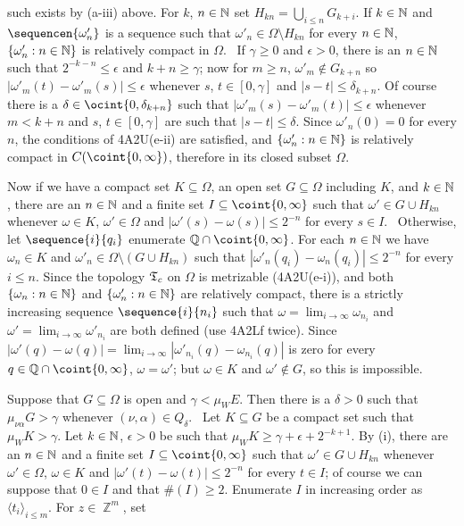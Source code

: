{

\noindent such exists by (a-iii) above.   For $k$, $n\in\Bbb N$ set
$H_{kn}=\bigcup_{i\le n}G_{k+i}$.   If $k\in\Bbb N$ and
$\sequencen{\omega'_n}$ is a sequence such that
$\omega'_n\in\Omega\setminus H_{kn}$ for every $n\in\Bbb N$,
$\{\omega'_n:n\in\Bbb N\}$ is relatively compact in $\Omega$.   \Prf\
If $\gamma\ge 0$ and $\epsilon>0$, there is an $n\in\Bbb N$
such that $2^{-k-n}\le\epsilon$ and $k+n\ge\gamma$;  now for $m\ge n$,
$\omega'_m\notin G_{k+n}$ so
$|\omega'_m(t)-\omega'_m(s)|\le\epsilon$ whenever
$s$, $t\in[0,\gamma]$ and $|s-t|\le\delta_{k+n}$.   Of course there is a
$\delta\in\ocint{0,\delta_{k+n}}$ such that
$|\omega'_m(s)-\omega'_m(t)|\le\epsilon$ whenever $m<k+n$ and $s$,
$t\in[0,\gamma]$ are such that $|s-t|\le\delta$.   Since $\omega'_n(0)=0$
for every $n$, the conditions of
4A2U(e-ii) are satisfied, and $\{\omega'_n:n\in\Bbb N\}$ is relatively
compact in $C(\coint{0,\infty})$, therefore in its closed subset $\Omega$.\
\Qed

Now if we have a compact set
$K\subseteq\Omega$, an open set $G\subseteq\Omega$ including $K$, and
$k\in\Bbb N$, there are an $n\in\Bbb N$ and a finite set
$I\subseteq\coint{0,\infty}$ such that $\omega'\in G\cup H_{kn}$ whenever
$\omega\in K$, $\omega'\in\Omega$ and $|\omega'(s)-\omega(s)|\le 2^{-n}$
for every $s\in I$.   \Prf\Quer\ Otherwise, let $\sequence{i}{q_i}$
enumerate $\Bbb Q\cap\coint{0,\infty}$.   For each $n\in\Bbb N$ we have
$\omega_n\in K$ and $\omega'_n\in\Omega\setminus(G\cup H_{kn})$ such that
$|\omega'_n(q_i)-\omega_n(q_i)|\le 2^{-n}$ for every $i\le n$.
Since the topology $\frak T_c$ on $\Omega$ is metrizable (4A2U(e-i)),
and both
$\{\omega_n:n\in\Bbb N\}$ and $\{\omega'_n:n\in\Bbb N\}$ are relatively
compact, there is a strictly increasing sequence $\sequence{i}{n_i}$ such
that $\omega=\lim_{i\to\infty}\omega_{n_i}$ and
$\omega'=\lim_{i\to\infty}\omega'_{n_i}$ are both defined (use 4A2Lf
twice).   Since $|\omega'(q)-\omega(q)|
=\lim_{i\to\infty}|\omega'_{n_i}(q)-\omega_{n_i}(q)|$ is zero for
every $q\in\Bbb Q\cap\coint{0,\infty}$, $\omega=\omega'$;  but
$\omega\in K$ and $\omega'\notin G$, so this is impossible.\ \Bang\Qed

\medskip

 Suppose that $G\subseteq\Omega$ is open and
$\gamma<\mu_WE$.   Then there is a $\delta>0$ such that
$\mu_{\nu\alpha}G>\gamma$ whenever $(\nu,\alpha)\in Q_{\delta}$.
\Prf\ Let $K\subseteq G$ be a compact set such that
$\mu_WK>\gamma$.   Let $k\in\Bbb N$, $\epsilon>0$ be such that
$\mu_WK\ge\gamma+\epsilon+2^{-k+1}$.
By (i), there are an $n\in\Bbb N$ and
a finite set $I\subseteq\coint{0,\infty}$ such that
$\omega'\in G\cup H_{kn}$ whenever $\omega'\in\Omega$, $\omega\in K$ and
$|\omega'(t)-\omega(t)|\le 2^{-n}$ for every $t\in I$;  of course we can
suppose that $0\in I$ and that $\#(I)\ge 2$.   Enumerate $I$ in increasing
order as $\langle t_i\rangle_{i\le m}$.   For $z\in\BbbZ^m$, set

}
